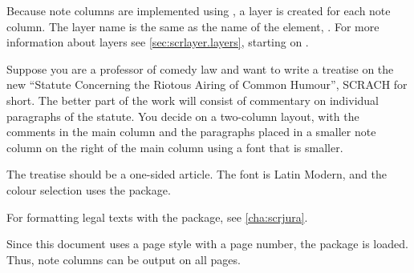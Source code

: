 Because note columns are implemented using , a
layer is created for each note column. The layer
name is the same as the name of the element,
. For more information about
layers see \autoref{sec:scrlayer.layers}, starting on
.
%
\begin{Example}
  Suppose you are a professor of comedy law and want to write a treatise on
  the new ``Statute Concerning the Riotous Airing of Common Humour'', SCRACH
  for short. The better part of the work will consist of commentary on
  individual paragraphs of the statute. You decide on a two-column layout,
  with the comments in the main column and the paragraphs placed in a smaller
  note column on the right of the main column using a font that is
  smaller.
  The treatise should be a one-sided article. The font is Latin Modern, and
  the colour selection uses the  package.

  For formatting legal texts with the
  \hyperref[cha:scrjura]{} package, see
  \autoref{cha:scrjura}.

  Since this document uses a page style with a
  page number, the
  \hyperref[cha:scrlayer-scrpage]{}%
   package is loaded. Thus, note columns can be
  output on all pages.


\end{Example}
